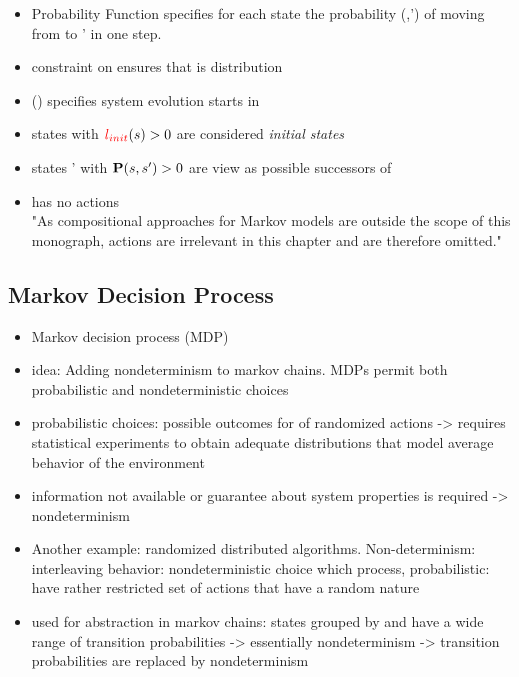 \documentclass[preview]{standalone}
\begin{document}
\begin{itemize}
	\item Probability Function \probtfunc specifies for each state \state the probability \probtfunc(\state,\state') of moving from \state to \state' in one step.
	\item constraint on \probtfunc ensures that \probtfunc is distribution
	\item \initdist(\state) specifies system evolution starts in \state
	\item states \state with ${\color{red}{l_{init}}}({s}) > 0$ are  considered \emph{initial states}
	\item states \state' with ${\textbf{P}}({s}, {s}') > 0$ are view as possible successors of \state
	\item has no actions \\ "As compositional approaches for Markov models are outside the scope of this monograph,
	actions are irrelevant in this chapter and are therefore omitted."
\end{itemize}

	

\subsection{Markov Decision Process} 


\begin{itemize}
	\item Markov decision process (MDP) 
	\item idea: Adding nondeterminism to markov chains. MDPs permit both probabilistic and nondeterministic choices 
	\item probabilistic choices: possible outcomes for of randomized actions -> requires statistical experiments to obtain adequate distributions that model average behavior of the environment
	\item information not available or guarantee about system properties is required -> nondeterminism
	\item Another example: randomized distributed algorithms. Non-determinism: interleaving behavior: nondeterministic choice which process, probabilistic: have rather restricted set of actions that have a random nature
	\item used for abstraction in markov chains: states grouped by \atomicprops and have a wide range of transition probabilities -> essentially nondeterminism -> transition probabilities are replaced by nondeterminism		
\end{itemize}
\end{document}
